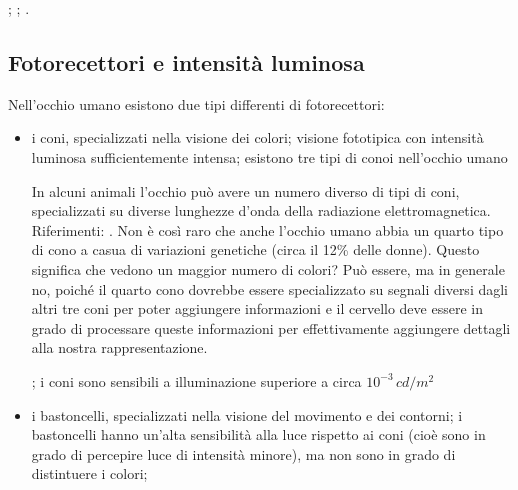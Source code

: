 \documentclass[letterpaper,10pt,italian]{jupyterBook}
\begin{document}
\sphinxAtStartPar
{} {\hyperref[\detokenize{ch/waves/optics-lens:physics-hs-waves-optics-geometric-lenses}]{}}; {\hyperref[\detokenize{ch/waves/optics-eye:physics-hs-waves-optics-eye}]{}}; {\hyperref[\detokenize{ch/electromagnetism/em-waves:physics-hs-electromagnetism-em-waves}]{}}.


\subsection{Fotorecettori e intensità luminosa}
\label{\detokenize{ch/intro/sensing-sight:fotorecettori-e-intensita-luminosa}}\label{\detokenize{ch/intro/sensing-sight:physics-hs-intro-sensing-sight-photoreceptors}}
\sphinxAtStartPar
Nell’occhio umano esistono due tipi differenti di fotorecettori:
\begin{itemize}
\item {} 
\sphinxAtStartPar
i coni, specializzati nella visione dei colori; visione fototipica con intensità luminosa sufficientemente intensa; esistono tre tipi di conoi nell’occhio umano%
\begin{footnote}[1]\sphinxAtStartFootnote
In alcuni animali l’occhio può avere un numero diverso di tipi di coni, specializzati su diverse lunghezze d’onda della radiazione elettromagnetica. Riferimenti: . Non è così raro che anche l’occhio umano abbia un quarto tipo di cono a casua di variazioni genetiche (circa il 12\% delle donne). Questo significa che vedono un maggior numero di colori? Può essere, ma in generale no, poiché il quarto cono dovrebbe essere specializzato su segnali diversi dagli altri tre coni \sphinxhyphen{} per poter aggiungere informazioni \sphinxhyphen{} e il cervello deve essere in grado di processare queste informazioni \sphinxhyphen{} per effettivamente aggiungere dettagli alla nostra rappresentazione.
%
\end{footnote}; i coni sono sensibili a illuminazione superiore a circa \(10^{-3} \, cd/m^2\)

\item {} 
\sphinxAtStartPar
i bastoncelli, specializzati nella visione del movimento e dei contorni; i bastoncelli hanno un’alta sensibilità alla luce rispetto ai coni (cioè sono in grado di percepire luce di intensità minore), ma non sono in grado di distintuere i colori;

\end{itemize}
\end{document}
